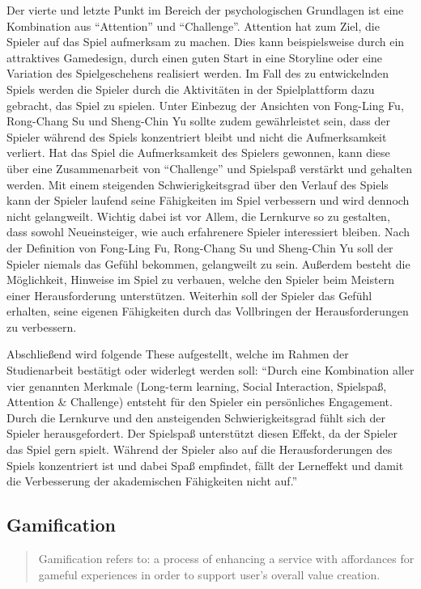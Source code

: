 	Der vierte und letzte Punkt im Bereich der psychologischen Grundlagen ist eine Kombination aus \enquote{Attention} und \enquote{Challenge}. Attention hat zum Ziel, die Spieler auf das Spiel aufmerksam zu machen. Dies kann beispielsweise durch ein attraktives Gamedesign, durch einen guten Start in eine Storyline oder eine Variation des Spielgeschehens realisiert werden. Im Fall des zu entwickelnden Spiels werden die Spieler durch die Aktivitäten in der Spielplattform dazu gebracht, das Spiel zu spielen. Unter Einbezug der Ansichten von Fong-Ling Fu, Rong-Chang Su und Sheng-Chin Yu sollte zudem gewährleistet sein, dass der Spieler während des Spiels konzentriert bleibt und nicht die Aufmerksamkeit verliert. Hat das Spiel die Aufmerksamkeit des Spielers gewonnen, kann diese über eine Zusammenarbeit von \enquote{Challenge} und Spielspaß verstärkt und gehalten werden.
	Mit einem steigenden Schwierigkeitsgrad über den Verlauf des Spiels kann der Spieler laufend seine Fähigkeiten im Spiel verbessern und wird dennoch nicht gelangweilt. Wichtig dabei ist vor Allem, die Lernkurve so zu gestalten, dass sowohl Neueinsteiger, wie auch erfahrenere Spieler interessiert bleiben. Nach der Definition von Fong-Ling Fu, Rong-Chang Su und Sheng-Chin Yu soll der Spieler niemals das Gefühl bekommen, gelangweilt zu sein. Außerdem besteht die Möglichkeit, Hinweise im Spiel zu verbauen, welche den Spieler beim Meistern einer Herausforderung unterstützen. Weiterhin soll der Spieler das Gefühl erhalten, seine eigenen Fähigkeiten durch das Vollbringen der Herausforderungen zu verbessern.

	Abschließend wird folgende These aufgestellt, welche im Rahmen der Studienarbeit bestätigt oder widerlegt werden soll:
	\enquote{Durch eine Kombination aller vier genannten Merkmale (Long-term learning, Social Interaction, Spielspaß, Attention \& Challenge) entsteht für den Spieler ein persönliches Engagement. Durch die Lernkurve und den ansteigenden Schwierigkeitsgrad fühlt sich der Spieler herausgefordert. Der Spielspaß unterstützt diesen Effekt, da der Spieler das Spiel gern spielt. Während der Spieler also auf die Herausforderungen des Spiels konzentriert ist und dabei Spaß empfindet, fällt der Lerneffekt und damit die Verbesserung der akademischen Fähigkeiten nicht auf.}

\subsection{Gamification}\label{ssec:gamification}
	\begin{quote}
		\vspace{\baselineskip}\hfill\begin{minipage}{0.96\textwidth}
			Gamification refers to: a process of enhancing a service with affordances for gameful experiences in order to support user's overall value creation.
		\end{minipage}
	\end{quote}

